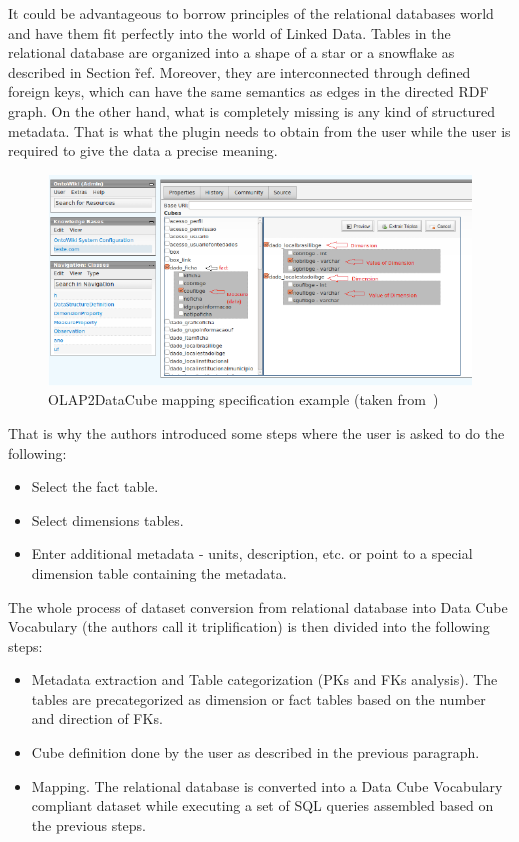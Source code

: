 It could be advantageous to borrow principles of the relational databases world and have them
fit perfectly into the world of Linked Data. Tables in the relational database 
are organized into a shape of a star or a snowflake as described in Section
\~ref{}. Moreover, they are interconnected through defined foreign keys,
which can have the same semantics as edges in the directed RDF graph.
On the other hand, what is completely missing is any kind of structured
metadata. That is what the plugin needs to obtain from the user while the user
is required to give the data a precise meaning.

\begin{figure}
	\centering
	\includegraphics[width=140mm]{img/olapimport.png}
	\caption{OLAP2DataCube mapping specification example (taken from~\cite{olap2dc})}
	\label{fig:olap2dc-screen}
\end{figure}


That is why the authors introduced some steps where the user is asked to 
do the following:
\begin{itemize}
  \item Select the fact table.
  \item Select dimensions tables.
  \item Enter additional metadata - units, description, etc. or point to a 
  special dimension table containing the metadata.
\end{itemize}

The whole process of dataset conversion from relational database into Data Cube Vocabulary
(the authors call it triplification) is then divided into the following steps:
\begin{itemize}
  \item Metadata extraction and Table categorization (PKs and FKs analysis). The 
  tables are precategorized as dimension or fact tables based on the number and 
  direction of FKs.
  \item Cube definition done by the user as described in the previous paragraph.
  \item Mapping. The relational database is converted into a Data Cube 
  Vocabulary compliant dataset while executing a set of SQL queries assembled 
  based on the previous steps.
\end{itemize}

